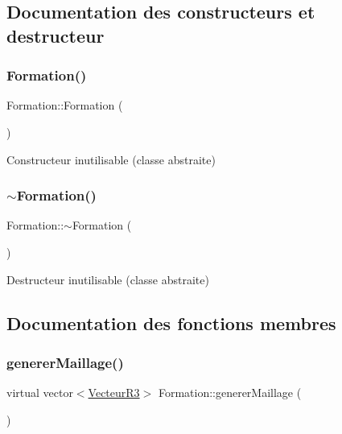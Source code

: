 \subsection{Documentation des constructeurs et destructeur}
\mbox{\label{class_formation_a60c3058dd353550d89183ec529909cb6}} 
\subsubsection{\texorpdfstring{Formation()}{Formation()}}
{\footnotesize\ttfamily Formation\+::\+Formation (\begin{DoxyParamCaption}{ }\end{DoxyParamCaption})}

Constructeur inutilisable (classe abstraite) \mbox{\label{class_formation_a5b4ffd37549ec211d85e52c916f35eb6}} 
\subsubsection{\texorpdfstring{$\sim$\+Formation()}{~Formation()}}
{\footnotesize\ttfamily Formation\+::$\sim$\+Formation (\begin{DoxyParamCaption}{ }\end{DoxyParamCaption})\hspace{0.3cm}{\ttfamily [virtual]}}

Destructeur inutilisable (classe abstraite) 

\subsection{Documentation des fonctions membres}
\mbox{\label{class_formation_ad1044228c0a1a4ee585ffe7f615c06ea}} 
\subsubsection{\texorpdfstring{generer\+Maillage()}{genererMaillage()}}
{\footnotesize\ttfamily virtual vector$<$\mbox{\hyperlink{class_vecteur_r3}{Vecteur\+R3}}$>$ Formation\+::generer\+Maillage (\begin{DoxyParamCaption}{ }\end{DoxyParamCaption})\hspace{0.3cm}{\ttfamily [pure virtual]}}

